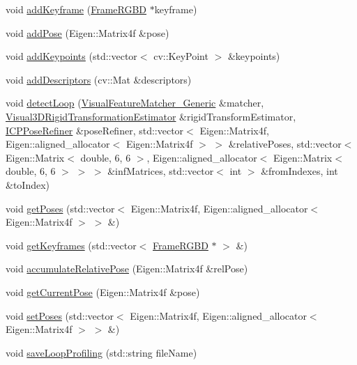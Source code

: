 \begin{DoxyCompactItemize}
\item 
void \hyperlink{class_keyframe_loop_detector_a5ef5a7ee9dde3e1dd875a5c952dee85b}{addKeyframe} (\hyperlink{class_frame_r_g_b_d}{FrameRGBD} $\ast$keyframe)
\item 
void \hyperlink{class_keyframe_loop_detector_af3d4e5a2dfb91c1f461952fb32b0c366}{addPose} (Eigen::Matrix4f \&pose)
\item 
void \hyperlink{class_keyframe_loop_detector_ac5c7855ada4a3660902f535a309b5394}{addKeypoints} (std::vector$<$ cv::KeyPoint $>$ \&keypoints)
\item 
void \hyperlink{class_keyframe_loop_detector_adad3db780d35efdb3c27bf3bc92c12eb}{addDescriptors} (cv::Mat \&descriptors)
\item 
void \hyperlink{class_keyframe_loop_detector_a9f171abd08e32c09d0db76725f027261}{detectLoop} (\hyperlink{class_visual_feature_matcher___generic}{VisualFeatureMatcher\_\-Generic} \&matcher, \hyperlink{class_visual3_d_rigid_transformation_estimator}{Visual3DRigidTransformationEstimator} \&rigidTransformEstimator, \hyperlink{class_i_c_p_pose_refiner}{ICPPoseRefiner} \&poseRefiner, std::vector$<$ Eigen::Matrix4f, Eigen::aligned\_\-allocator$<$ Eigen::Matrix4f $>$ $>$ \&relativePoses, std::vector$<$ Eigen::Matrix$<$ double, 6, 6 $>$, Eigen::aligned\_\-allocator$<$ Eigen::Matrix$<$ double, 6, 6 $>$ $>$ $>$ \&infMatrices, std::vector$<$ int $>$ \&fromIndexes, int \&toIndex)
\item 
void \hyperlink{class_keyframe_loop_detector_a5b5a6c7378ab3846693c9d0025b7aa37}{getPoses} (std::vector$<$ Eigen::Matrix4f, Eigen::aligned\_\-allocator$<$ Eigen::Matrix4f $>$ $>$ \&)
\item 
void \hyperlink{class_keyframe_loop_detector_a7043fa83b96b7407d4b4d31610574afe}{getKeyframes} (std::vector$<$ \hyperlink{class_frame_r_g_b_d}{FrameRGBD} $\ast$ $>$ \&)
\item 
void \hyperlink{class_keyframe_loop_detector_aa9b5a576a6c1a696840b3aeb208f2e40}{accumulateRelativePose} (Eigen::Matrix4f \&relPose)
\item 
void \hyperlink{class_keyframe_loop_detector_afce6712ebcfabb34d34b7917b7f18ea9}{getCurrentPose} (Eigen::Matrix4f \&pose)
\item 
void \hyperlink{class_keyframe_loop_detector_af4d7c5e2e9404d63197077c67fca0662}{setPoses} (std::vector$<$ Eigen::Matrix4f, Eigen::aligned\_\-allocator$<$ Eigen::Matrix4f $>$ $>$ \&)
\item 
void \hyperlink{class_keyframe_loop_detector_af4cdff4bb98bd31b5a16347cff2da072}{saveLoopProfiling} (std::string fileName)
\end{DoxyCompactItemize}
